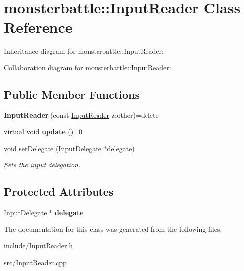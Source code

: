 \hypertarget{classmonsterbattle_1_1InputReader}{}\section{monsterbattle\+:\+:Input\+Reader Class Reference}
\label{classmonsterbattle_1_1InputReader}


Inheritance diagram for monsterbattle\+:\+:Input\+Reader\+:


Collaboration diagram for monsterbattle\+:\+:Input\+Reader\+:
\subsection*{Public Member Functions}
\begin{DoxyCompactItemize}
\item 
\mbox{\label{classmonsterbattle_1_1InputReader_ae1817af0926c7ac55c097629b775015b}} 
{\bfseries Input\+Reader} (const \hyperlink{classmonsterbattle_1_1InputReader}{Input\+Reader} \&other)=delete
\item 
\mbox{\label{classmonsterbattle_1_1InputReader_a82d3416ed9ff87c7bf7195a302b7318f}} 
virtual void {\bfseries update} ()=0
\item 
\mbox{\label{classmonsterbattle_1_1InputReader_a2a9bcbf5a1b5e0a926b099d93a21db8e}} 
void \hyperlink{classmonsterbattle_1_1InputReader_a2a9bcbf5a1b5e0a926b099d93a21db8e}{set\+Delegate} (\hyperlink{structmonsterbattle_1_1InputDelegate}{Input\+Delegate} $\ast$delegate)
\begin{DoxyCompactList}\small\item\em Sets the input delegation. \end{DoxyCompactList}\end{DoxyCompactItemize}
\subsection*{Protected Attributes}
\begin{DoxyCompactItemize}
\item 
\mbox{\label{classmonsterbattle_1_1InputReader_a04bdf0a3dcfe1818db02ae6a1ddd17fe}} 
\hyperlink{structmonsterbattle_1_1InputDelegate}{Input\+Delegate} $\ast$ {\bfseries delegate}
\end{DoxyCompactItemize}


The documentation for this class was generated from the following files\+:\begin{DoxyCompactItemize}
\item 
include/\hyperlink{InputReader_8h}{Input\+Reader.\+h}\item 
src/\hyperlink{InputReader_8cpp}{Input\+Reader.\+cpp}\end{DoxyCompactItemize}
